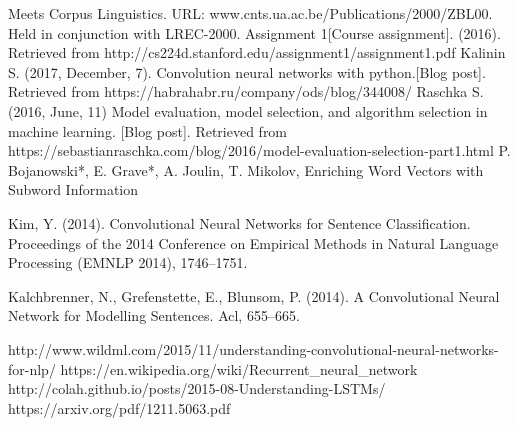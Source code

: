 \begin{thebibliography}
	 Meets Corpus Linguistics. URL: www.cnts.ua.ac.be/Publications/2000/ZBL00. Held in
	 conjunction with LREC-2000.
	 {}
	  Assignment 1[Course assignment]. (2016). Retrieved from http://cs224d.stanford.edu/assignment1/assignment1.pdf 
	 {}
		Kalinin S. (2017, December, 7). Convolution neural networks with python.[Blog post]. Retrieved from https://habrahabr.ru/company/ods/blog/344008/
		Raschka S. (2016, June, 11) Model evaluation, model selection, and algorithm selection in machine learning. [Blog post]. Retrieved from
		https://sebastianraschka.com/blog/2016/model-evaluation-selection-part1.html
	 P. Bojanowski*, E. Grave*, A. Joulin, T. Mikolov, Enriching Word Vectors with Subword Information

	Kim, Y. (2014). Convolutional Neural Networks for Sentence Classification. Proceedings of the 2014 Conference on Empirical Methods in Natural Language Processing (EMNLP 2014), 1746–1751.
	
	Kalchbrenner, N., Grefenstette, E.,  Blunsom, P. (2014). A Convolutional Neural Network for Modelling Sentences. Acl, 655–665.
	
	http://www.wildml.com/2015/11/understanding-convolutional-neural-networks-for-nlp/
	https://en.wikipedia.org/wiki/Recurrent\_neural\_network 
	http://colah.github.io/posts/2015-08-Understanding-LSTMs/
	https://arxiv.org/pdf/1211.5063.pdf
	
\end{thebibliography}
